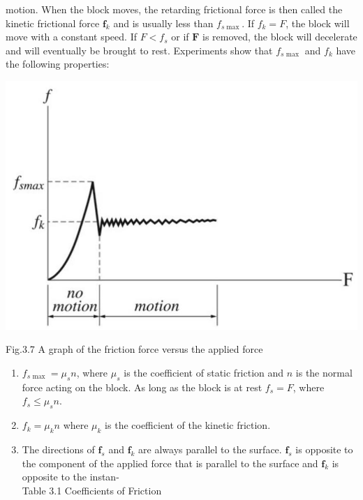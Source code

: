 \documentclass[10pt]{article}
\begin{document}
motion. When the block moves, the retarding frictional force is then called the kinetic frictional force $\mathbf{f}_{k}$ and is usually less than $f_{s \max }$. If $f_{k}=F$, the block will move with a constant speed. If $F<f_{s}$ or if $\mathbf{F}$ is removed, the block will decelerate and will eventually be brought to rest. Experiments show that $f_{s \text { max }}$ and $f_{k}$ have the following properties:

\begin{center}
\includegraphics[max width=\textwidth]{2024_09_13_db1f357d2aad0a03eb2eg-053}
\end{center}

Fig.3.7 A graph of the friction force versus the applied force

\begin{enumerate}
  \item $f_{s \text { max }}=\mu_{s} n$, where $\mu_{s}$ is the coefficient of static friction and $n$ is the normal force acting on the block. As long as the block is at rest $f_{s}=F$, where $f_{s} \leq \mu_{s} n$.
  \item $f_{k}=\mu_{k} n$ where $\mu_{k}$ is the coefficient of the kinetic friction.
  \item The directions of $\mathbf{f}_{s}$ and $\mathbf{f}_{k}$ are always parallel to the surface. $\mathbf{f}_{s}$ is opposite to the component of the applied force that is parallel to the surface and $\mathbf{f}_{k}$ is opposite to the instan-\\
Table 3.1 Coefficients of Friction
\end{enumerate}
\end{document}
